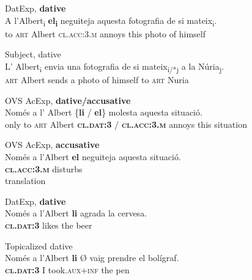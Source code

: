 \documentclass[output=paper,colorlinks,citecolor=brown,nonflat,modfonts]{langsci/langscibook}
\begin{document}
 \ex DatExp, \textbf{dative}\label{ex:royo:8b}\\
 \gll A l’Albert\textsubscript{i} \textbf{el\textsubscript{i}} neguiteja aquesta fotografia de si mateix\textsubscript{i}.\\
 to \textsc{art} Albert {\textsc{cl.acc:3.m}} annoys this photo of himself\\
\glt {}

 
  \ex Subject, dative\label{ex:royo:8d}\\
 \gll L’ Albert\textsubscript{i} envia una fotografia de si mateix\textsubscript{i/*j} a la Núria\textsubscript{j}.\\
 \textsc{art} Albert sends a photo of himself to \textsc{art} Nuria\\
\glt {}
 
 \z
 \z

\ea%
 \label{ex:royo:9}
 \ea OVS AcExp, \textbf{dative/accusative} \label{ex:royo:9a}\\
 \gll Només a l’ Albert \{\textbf{li} / \textbf{el}\} molesta aquesta situació. \\
 only to \textsc{art} Albert \textbf{\textsc{cl.dat:3}} / \textbf{\textsc{cl.acc:3.m}} annoys this situation \\
\glt {}
 
 \ex OVS AcExp, \textbf{accusative} \label{ex:royo:9b}\\
 \gll Només a l’Albert \textbf{el} neguiteja aquesta situació.\\
  \textbf{\textsc{cl.acc:3.m}} disturbs  \\
 \glt  translation
 
  \ex DatExp, \textbf{dative} \label{ex:royo:9c}\\
 \gll   Només a l’Albert \textbf{li} agrada la cervesa. \\
 \textbf{\textsc{cl.dat:3}} likes the beer    \\
\glt {}
 
 \ex Topicalized dative \label{ex:royo:9d}\\
\gll  Només a l’Albert \textbf{li} Ø vaig prendre el bolígraf.\footnotemark{}\\
\textbf{\textsc{cl.dat:3}} I took.\textsc{aux+inf} the pen     \\
\glt {}
 \z
 \z
 
\end{document}
